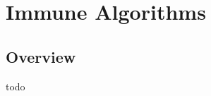 


\chapter{Immune Algorithms}
\label{ch:immune}

\section{Overview}
todo


\newpage
\newpage
\newpage
\newpage
\newpage
